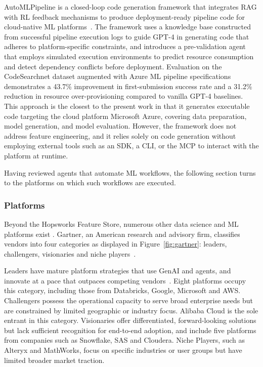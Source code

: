 \documentclass[
english,                 %
bibtex,                  %
]{kththesis}
\numberwithin{listing}{chapter}
\begin{document}
Auto\gls{ML}Pipeline is a closed-loop code generation framework that integrates \gls{RAG} with \gls{RL} feedback mechanisms to produce deployment-ready pipeline code for cloud-native \gls{ML} platforms~\cite{zhao_automl-pipeline_2026}. The framework uses a knowledge base constructed from successful pipeline execution logs to guide \gls{GPT}-4 in generating code that adheres to platform-specific constraints, and introduces a pre-validation agent that employs simulated execution environments to predict resource consumption and detect dependency conflicts before deployment. Evaluation on the CodeSearch\Gls{net} dataset augmented with Azure \gls{ML} pipeline specifications demonstrates a 43.7\% improvement in first-submission success rate and a 31.2\% reduction in resource over-provisioning compared to vanilla \gls{GPT}-4 baselines. This approach is the closest to the present work in that it generates executable code targeting the cloud platform Microsoft Azure, covering data preparation, model generation, and model evaluation. However, the framework does not address feature engineering, and it relies solely on code generation without employing external tools such as an \gls{SDK}, a \gls{CLI}, or the \gls{MCP} to interact with the platform at runtime.

Having reviewed agents that automate \gls{ML} workflows, the following section turns to the platforms on which such workflows are executed.

\subsubsection{Platforms}
\label{sec:bg_platforms}

Beyond the Hopsworks Feature Store, numerous other data science and \gls{ML} platforms exist \cite{jaffri_magic_2025}. Gartner, an American research and advisory firm, classifies vendors into four categories as displayed in Figure~\ref{fig:gartner}: leaders, challengers, visionaries and niche players~\cite{gartner_inc_magic_2026}.

Leaders have mature platform strategies that use \gls{GenAI} and agents, and innovate at a pace that outpaces competing vendors~\cite{jaffri_magic_2025}. Eight platforms occupy this category, including those from Databricks, Google, Microsoft and \gls{AWS}. Challengers possess the operational capacity to serve broad enterprise needs but are constrained by limited geographic or industry focus. Alibaba Cloud is the sole entrant in this category. Visionaries offer differentiated, forward-looking solutions but lack sufficient recognition for end-to-end adoption, and include five platforms from companies such as Snowflake, \gls{SAS} and Cloudera. Niche Players, such as Alteryx and MathWorks, focus on specific industries or user groups but have limited broader market traction.
\end{document}
